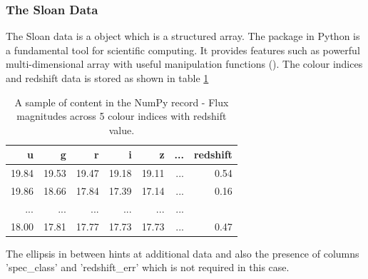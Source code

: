 \subsubsection{The Sloan Data}
The Sloan data is a  object which is a structured array. The  package in Python is a fundamental tool for scientific computing. It provides features such as powerful multi-dimensional array with useful manipulation functions (). The colour indices and redshift data is stored as shown in table \ref{tbl:tbn}

\begin{table}[ht]
	\centering
	\begin{tabular}{rrrrrrr}
		u & g & r & i & z & ... & redshift\\
		\hline
		19.84 &    19.53 &    19.47 &    19.18 &    19.11 &    ... & 0.54\\
		19.86 &    18.66 &    17.84 &    17.39 &    17.14 &    ...    & 0.16\\
		...    & ... &    ... & ... &    ... &...\\
		18.00 &    17.81 &    17.77 &    17.73 &    17.73 &    ...    & 0.47
	\end{tabular}
	\caption{ A sample of content in the NumPy record - Flux magnitudes across 5 colour indices with redshift value.}
	\label{tbl:tbn}
\end{table}
The ellipsis in between hints at additional data and also the presence of columns 'spec\_class' and 'redshift\_err' which is not required in this case. 

